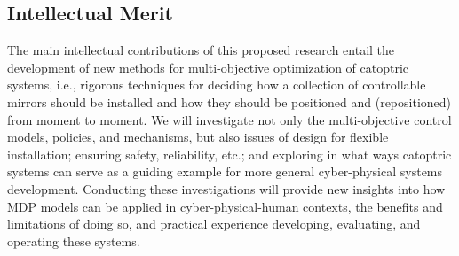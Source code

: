 \subsection{Intellectual Merit}
\label{sec:merit}

The main intellectual contributions of this proposed research entail
the development of new methods for multi-objective optimization of 
catoptric systems, i.e., rigorous techniques for deciding how a 
collection of controllable mirrors should be installed and how they 
should be positioned and (repositioned) from moment to moment.  We
will investigate not only the multi-objective control models,
policies, and mechanisms, but also issues of design for flexible
installation; ensuring safety, reliability, etc.; and exploring in
what ways catoptric systems can serve as a guiding example for more
general cyber-physical systems development.  Conducting these 
investigations will provide new insights into how MDP models can
be applied in cyber-physical-human contexts, the benefits and limitations
of doing so, and practical experience developing, evaluating, and operating
these systems.
